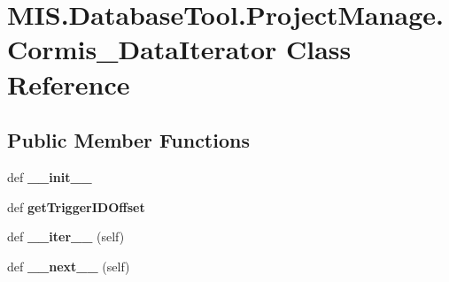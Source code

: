 \hypertarget{classMIS_1_1DatabaseTool_1_1ProjectManage_1_1Cormis__DataIterator}{}\section{M\+I\+S.\+Database\+Tool.\+Project\+Manage.\+Cormis\+\_\+\+Data\+Iterator Class Reference}
\label{classMIS_1_1DatabaseTool_1_1ProjectManage_1_1Cormis__DataIterator}
\subsection*{Public Member Functions}
\begin{DoxyCompactItemize}
\item 
\mbox{\label{classMIS_1_1DatabaseTool_1_1ProjectManage_1_1Cormis__DataIterator_a83eb3d89802ce041a77f7317656ef5a7}} 
def {\bfseries \+\_\+\+\_\+init\+\_\+\+\_\+}
\item 
\mbox{\label{classMIS_1_1DatabaseTool_1_1ProjectManage_1_1Cormis__DataIterator_a8ff4ef23bd8543fa3635015236f0b950}} 
def {\bfseries get\+Trigger\+I\+D\+Offset}
\item 
\mbox{\label{classMIS_1_1DatabaseTool_1_1ProjectManage_1_1Cormis__DataIterator_a4aed8d71f169cf19192cf925fc356224}} 
def {\bfseries \+\_\+\+\_\+iter\+\_\+\+\_\+} (self)
\item 
\mbox{\label{classMIS_1_1DatabaseTool_1_1ProjectManage_1_1Cormis__DataIterator_a6a020e90326266becabb7d38bf5f2f08}} 
def {\bfseries \+\_\+\+\_\+next\+\_\+\+\_\+} (self)
\end{DoxyCompactItemize}
